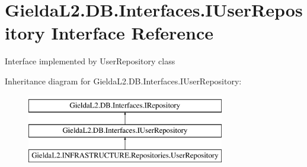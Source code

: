 \hypertarget{interface_gielda_l2_1_1_d_b_1_1_interfaces_1_1_i_user_repository}{}\section{Gielda\+L2.\+D\+B.\+Interfaces.\+I\+User\+Repository Interface Reference}
\label{interface_gielda_l2_1_1_d_b_1_1_interfaces_1_1_i_user_repository}


Interface implemented by User\+Repository class  


Inheritance diagram for Gielda\+L2.\+D\+B.\+Interfaces.\+I\+User\+Repository\+:\begin{figure}[H]
\begin{center}
\leavevmode
\includegraphics[height=3.000000cm]{interface_gielda_l2_1_1_d_b_1_1_interfaces_1_1_i_user_repository}
\end{center}
\end{figure}
